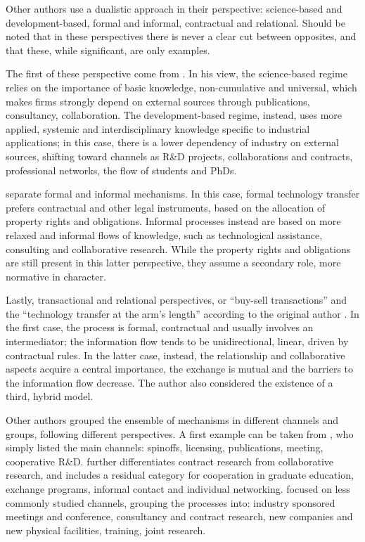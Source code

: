 Other authors use a dualistic approach in their perspective: science-based and development-based, formal and informal, contractual and relational. Should be noted that in these perspectives there is never a clear cut between opposites, and that these, while significant, are only examples.

The first of these perspective come from \citet{Gilsing2011}. In his view, the science-based regime relies on the importance of basic knowledge, non-cumulative and universal, which makes firms strongly depend on external sources through publications, consultancy, collaboration. The development-based regime, instead, uses more applied, systemic and interdisciplinary knowledge specific to industrial applications; in this case, there is a lower dependency of industry on external sources, shifting toward channels as R\&D projects, collaborations and contracts, professional networks, the flow of students and PhDs. 

\citet{Link2007} separate formal and informal mechanisms. In this case, formal technology transfer prefers contractual and other legal instruments, based on the allocation of property rights and obligations. Informal processes instead are based on more relaxed and informal flows of knowledge, such as technological assistance, consulting and collaborative research. While the property rights and obligations are still present in this latter perspective, they assume a secondary role, more normative in character.

Lastly, transactional and relational perspectives, or \enquote{buy-sell transactions} and the \enquote{technology transfer at the arm's length} according to the original author \citep{Harmon1997}. In the first case, the process is formal, contractual and usually involves an intermediator; the information flow tends to be unidirectional, linear, driven by contractual rules. In the latter case, instead, the relationship and collaborative aspects acquire a central importance, the exchange is mutual and the barriers to the information flow decrease. The author also considered the existence of a third, hybrid model. 

Other authors grouped the ensemble of mechanisms in different channels and groups, following different perspectives. A first example can be taken from 	\citet{Rogers2001}, who simply listed the main channels: spinoffs, licensing, publications, meeting, cooperative R\&D. \citet{Debackere2005} further differentiates contract research from collaborative research, and includes a residual category for cooperation in graduate education, exchange programs, informal contact and individual networking. \citet{DEste2007} focused on less commonly studied channels, grouping the processes into: industry sponsored meetings and conference, consultancy and contract research, new companies and new physical facilities, training, joint research. 

